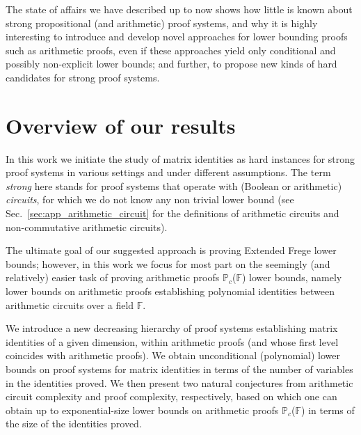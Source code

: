 \documentclass[12pt,reqno]{article}
\newcommand\F{\ensuremath{\mathbb F}}
\newcommand\PP{{\mathbb P}}
\newcommand\PC{\ensuremath{\PP_c}}
\begin{document}
The state of affairs we have described up to now shows how little is known about strong propositional (and arithmetic) proof systems, and why it is highly interesting to introduce and develop novel approaches for lower bounding proofs such as arithmetic proofs, even if these approaches yield only conditional and possibly non-explicit lower bounds; and further, to propose new kinds of hard candidates for strong proof systems.   %

\section{Overview of our results}\label{sec:ovrv_of_our_results}
In this work we initiate the study of matrix identities as hard instances for strong proof systems in various settings and under different assumptions. %
The term \textit{strong} here stands for proof systems that operate with (Boolean or arithmetic) \textit{circuits}, for which we do not know any non trivial lower bound (see Sec.~\ref{sec:app_arithmetic_circuit} for the definitions of arithmetic circuits and non-commutative arithmetic circuits).

The  ultimate goal of our suggested approach is proving Extended Frege lower bounds; however, in this work we focus for most part on the seemingly (and relatively) easier task of proving arithmetic proofs \PC(\F) lower bounds, namely lower bounds on arithmetic proofs establishing polynomial identities between arithmetic circuits over a field \F.




 We introduce a new decreasing hierarchy of proof systems establishing matrix identities of a given dimension,  within arithmetic proofs (and whose first level coincides with arithmetic proofs). We obtain unconditional (polynomial) lower bounds on proof systems for matrix identities in terms of the number of variables in the identities proved. We then present two natural conjectures from arithmetic circuit complexity and proof complexity, respectively, based on which one can obtain up to exponential-size lower bounds on arithmetic proofs \PC(\F) in terms of the size of the identities proved.  \smallskip
\end{document}
